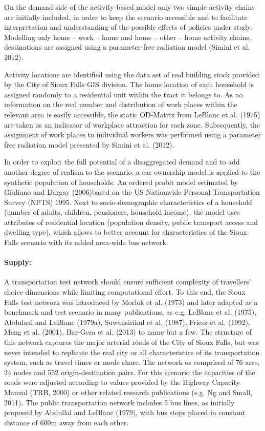 On the demand side of the activity-based model only two simple activity chains are initially included, in order to keep the scenario accessible and to facilitate interpretation and understanding of the possible effects of policies under study. Modelling only home – work – home and home – other – home activity chains, destinations are assigned using a parameter-free radiation model (Simini et al. 2012).

Activity locations are identified using the data set of real building stock provided by the City of Sioux Falls GIS division. The home location of each household is assigned randomly to a residential unit within the tract it belongs to. As no information on the real number and distribution of work places within the relevant area is easily accessible, the static OD-Matrix from LeBlanc et al. (1975) are taken as an indicator of workplace attraction for each zone. Subsequently, the assignment of work places to individual workers was performed using a parameter free radiation model presented by Simini et al. (2012).

In order to exploit the full potential of a disaggregated demand and to add another degree of realism to the scenario, a car ownership model is applied to the synthetic population of households. An ordered probit model estimated by Giuliano and Dargay (2006)based on the US Nationwide Personal Transportation Survey (NPTS) 1995. Next to socio-demographic characteristics of a household (number of adults, children, pensioners, household income), the model uses attributes of residential location (population density, public transport access and dwelling type), which allows to better account for characteristics of the Sioux-Falls scenario with its added area-wide bus network. 

\paragraph{Supply:} 

A transportation test network should ensure sufficient complexity of travellers’ choice dimensions while limiting computational effort. To this end, the Sioux Falls test network was introduced by Morlok et al. (1973) and later adapted as a benchmark and test scenario in many publications, as e.g. LeBlanc et al. (1975), Abdulaal and LeBlanc (1979a), Suwansirikul et al.  (1987), Friesz et al. (1992), Meng et al. (2001), Bar-Gera et al. (2013) to name but a few. The structure of this network captures the major arterial roads of the City of Sioux Falls, but was never intended to replicate the real city or all characteristics of its transportation system, such as travel times or mode share. The network os comprised of 76 arcs, 24 nodes and 552 origin-destination pairs. For this scenario the capacities of the roads were adjusted according to values provided by the Highway Capacity Manual (TRB, 2000) or other related research publications (e.g. Ng and Small, 2011). The public transportation network includes 5  bus lines, as initially proposed by Abdullal and LeBlanc (1979), with bus stops placed in constant distance of 600m away from each other. 

